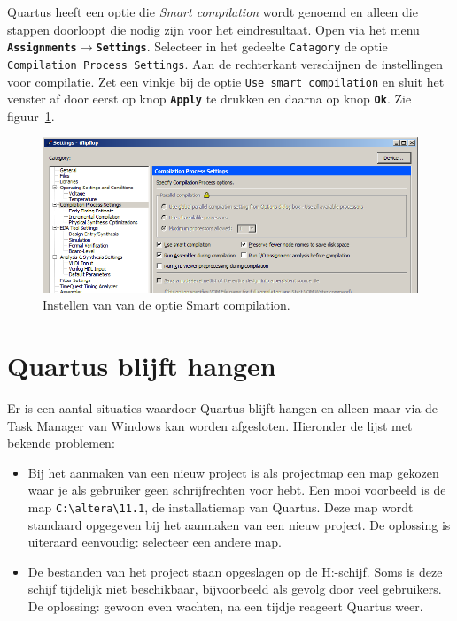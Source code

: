 \documentclass[a4paper,12pt,fleqn,twoside]{book}
\def\tutpicscale{0.455}
\newcommand{\menu}[1]{\texttt{\textbf{#1}}}
\newcommand{\knop}[1]{\texttt{\textbf{#1}}}
\newcommand{\naam}[1]{\texttt{#1}}
\def\pijl{$\rightarrow$}%
\begin{document}
Quartus heeft een optie die \textsl{Smart compilation} wordt genoemd en
alleen die stappen doorloopt die nodig zijn voor het eindresultaat. Open via
het menu \menu{Assignments\pijl{}Settings}. Selecteer in het gedeelte
\naam{Catagory} de optie \naam{Compilation Process Settings}. Aan de 
rechterkant verschijnen de instellingen voor compilatie. Zet een vinkje
bij de optie \naam{Use smart compilation} en sluit het venster af
door eerst op knop \knop{Apply} te drukken en daarna op knop \knop{Ok}.
Zie figuur~\ref{fig:225smartcompilation}.

\begin{figure}[H]
\centering
\includegraphics[scale=\tutpicscale]{225smartcompilation.png}
\caption{Instellen van van de optie Smart compilation.}
\label{fig:225smartcompilation}
\end{figure}


\section{Quartus blijft hangen}
\label{sec:quartusblijfthangen}
Er is een aantal situaties waardoor Quartus blijft hangen en alleen maar
via de Task Manager van Windows kan worden afgesloten. Hieronder de lijst met
bekende problemen:

\begin{itemize}\itemsep-1pt
\item Bij het aanmaken van een nieuw project is als projectmap een map gekozen
      waar je als gebruiker geen schrijfrechten voor hebt. Een mooi voorbeeld
      is de map \lstinline|C:\altera\11.1|, de installatiemap van Quartus.
      Deze map wordt standaard opgegeven bij het aanmaken van een nieuw
      project. De oplossing is uiteraard eenvoudig: selecteer een andere map.
\item De bestanden van het project staan opgeslagen op de H:-schijf. Soms is
      deze schijf tijdelijk niet beschikbaar, bijvoorbeeld als gevolg door
      veel gebruikers. De oplossing: gewoon even wachten, na een tijdje
      reageert Quartus weer.
\end{itemize}
\end{document}
